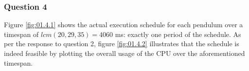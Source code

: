 \subsubsection{Question 4}

Figure \ref{fig:01.4.1} shows the actual execution schedule for each pendulum
over a timespan of $lcm(20,29,35) = 4060$ ms: exactly one period of the schedule.
As per the response to question 2, figure \ref{fig:01.4.2} illustrates that the
schedule is indeed feasible by plotting the overall usage of the CPU over the
aforementioned timespan.

\noindent{}

